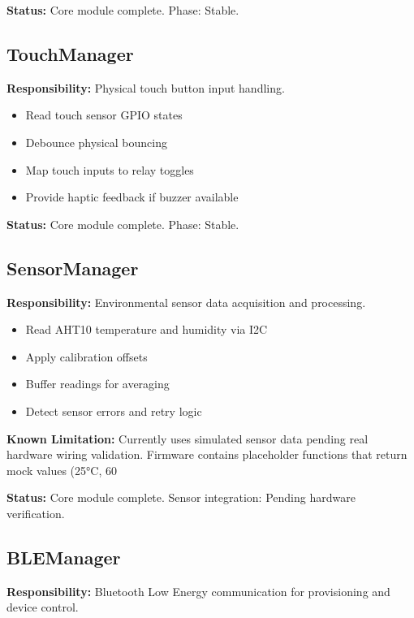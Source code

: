 \textbf{Status:} Core module complete. Phase: Stable.

\subsection{TouchManager}

\textbf{Responsibility:} Physical touch button input handling.

\begin{itemize}
    \item Read touch sensor GPIO states
    \item Debounce physical bouncing
    \item Map touch inputs to relay toggles
    \item Provide haptic feedback if buzzer available
\end{itemize}

\textbf{Status:} Core module complete. Phase: Stable.

\subsection{SensorManager}

\textbf{Responsibility:} Environmental sensor data acquisition and processing.

\begin{itemize}
    \item Read AHT10 temperature and humidity via I2C
    \item Apply calibration offsets
    \item Buffer readings for averaging
    \item Detect sensor errors and retry logic
\end{itemize}

\textbf{Known Limitation:} Currently uses simulated sensor data pending real hardware wiring validation. Firmware contains placeholder functions that return mock values (25°C, 60%

\textbf{Status:} Core module complete. Sensor integration: Pending hardware verification.

\subsection{BLEManager}

\textbf{Responsibility:} Bluetooth Low Energy communication for provisioning and device control.

